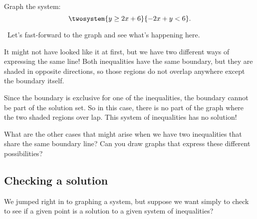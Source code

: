 \begin{boxedex}
Graph the system:\[\twosystem{y\geq2x+6}{-2x+y<6}.\]

\exsoln\ Let's fast-forward to the graph and see what's happening here.

\begin{center}
\end{center}

It might not have looked like it at first, but we have two different ways of expressing the same line! Both inequalities have the same boundary, but they are shaded in opposite directions, so those regions do not overlap anywhere except the boundary itself.

Since the boundary is exclusive for one of the inequalities, the boundary cannot be part of the solution set. So in this case, there is no part of the graph where the two shaded regions over lap. This system of inequalities has no solution!
\end{boxedex}

What are the other cases that might arise when we have two inequalities that share the same boundary line? Can you draw graphs that express these different possibilities?

\subsection{Checking a solution}

We jumped right in to graphing a system, but suppose we want simply to check to see if a given point is a solution to a given system of inequalities?

